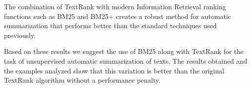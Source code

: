 \documentclass{llncs}
\begin{document}
The combination of TextRank with modern Information Retrieval ranking functions such as BM25 and BM25+ creates a robust method for automatic summarization that performs better than the standard techniques used previously. 

Based on these results we suggest the use of BM25 along with TextRank for the task of unsupervised automatic summarization of texts. The results obtained and the examples analyzed show that this variation is better than the original TextRank algorithm without a performance penalty.

{}

\end{document}
